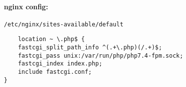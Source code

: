 \documentclass{article}
\begin{document}
\paragraph{nginx config:} 

\verb|/etc/nginx/sites-available/default|

\begin{verbatim}
    location ~ \.php$ {                                                                                                  
    fastcgi_split_path_info ^(.+\.php)(/.+)$;                                                                        
    fastcgi_pass unix:/var/run/php/php7.4-fpm.sock;                                                                  
    fastcgi_index index.php;                                                                                         
    include fastcgi.conf;                                                                                            
}        
\end{verbatim}
\end{document}
